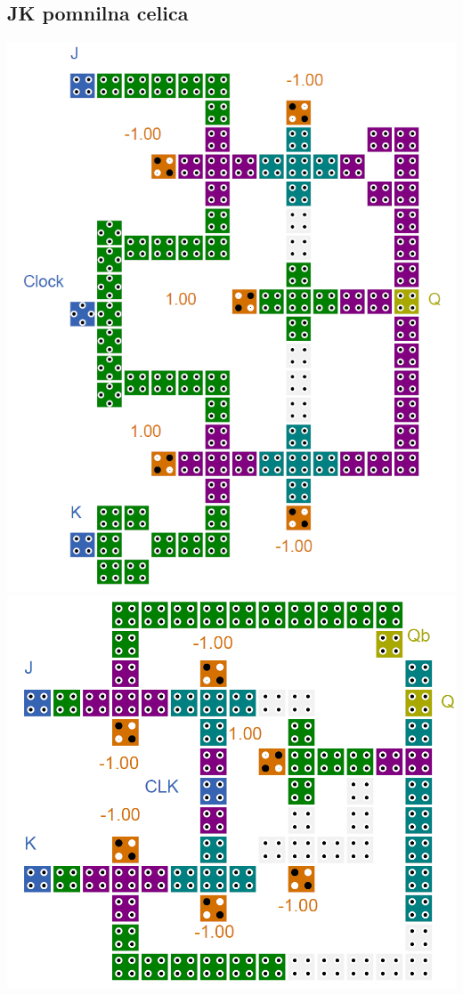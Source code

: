 \documentclass[a4paper, 11pt]{article}
\begin{document}
\subsection{JK pomnilna celica}
\includegraphics[scale=0.5]{../img/vir_4/jk.png} 
\includegraphics[scale=0.35]{../img/vir_5/jk.png} 
\end{document}
